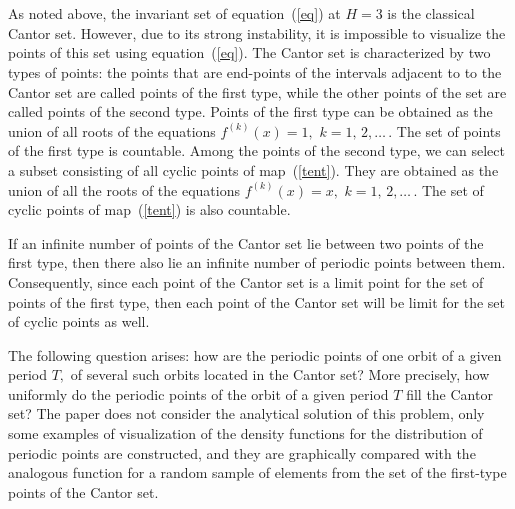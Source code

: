 \documentclass[12pt,a4paper]{amsart}
\begin{document}
\section{}

As noted above, the invariant set of equation~(\ref{eq}) at $H=3$ is the classical Cantor set. However, due to its strong instability, it is impossible to visualize 
the points of this set using equation~(\ref{eq}). The Cantor set is characterized by two types of points: the points that are end-points of the intervals adjacent to 
to the Cantor set are called points of the first type, while the other points of the set are called points of the second type. Points of the first type can be obtained 
as the union of all roots of the equations $f^{(k)}(x) = 1,$ $k=1,\,2,\ldots\,$. The set of points of the first type is countable. Among the points of the second type, we can select
a subset consisting of all cyclic points of map~(\ref{tent}). They are obtained as the union of all the roots of the equations $f^{(k)}(x) = x,$ $k=1,\,2,\ldots\,$. 
The set of cyclic points of map~(\ref{tent}) is also countable.

If an infinite number of points of the Cantor set lie between two points of the first type, then there also lie an infinite number of periodic points between them. 
Consequently, since each point of the Cantor set is a limit point for the set of points of the first type, then each point of the Cantor set will be limit for the set 
of cyclic points as well.

The following question arises: how are the periodic points of one orbit of a given period $T,$ of several such orbits located in the Cantor set? More precisely, how uniformly 
do the periodic points of the orbit of a given period $T$ fill the Cantor set? The paper does not consider the analytical solution of this problem, 
only some examples of visualization of the density functions for the distribution of periodic points are constructed, and they are graphically compared with 
the analogous function for a random sample of elements from the set of the first-type points of the Cantor set.
\end{document}
